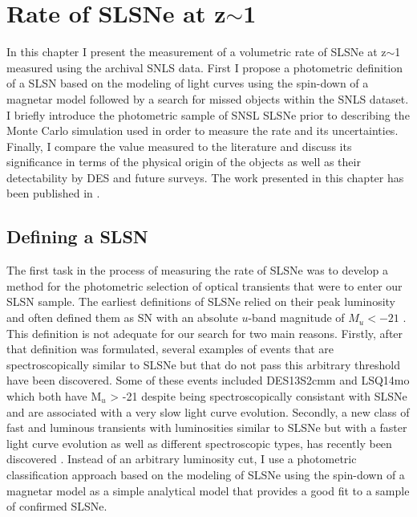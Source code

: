 \chapter{Rate of SLSNe at z$\sim$1}
\label{Chapter3}

In this chapter I present the measurement of a volumetric rate of SLSNe at z$\sim$1 measured using the archival SNLS data. First I propose a photometric definition of a SLSN based on the modeling of light curves using the spin-down of a magnetar model followed by a search for missed objects within the SNLS dataset. I briefly introduce the photometric sample of SNSL SLSNe prior to describing the Monte Carlo simulation used in order to measure the rate and its uncertainties. Finally, I compare the value measured to the literature and discuss its significance in terms of the physical origin of the objects as well as their detectability by DES and future surveys. The work presented in this chapter has been published in \citet{Prajs2016}.

\section{Defining a SLSN}
\label{sec:SLSNDefinition}
The first task in the process of measuring the rate of SLSNe was to develop a method for the photometric selection of optical transients that were to enter our SLSN sample. The earliest definitions of SLSNe relied on their peak luminosity and often defined them as SN with an absolute $u$-band magnitude of $M_{u}<-21$ \citep{Gal-Yam2012}. This definition is not adequate for our search for two main reasons. Firstly, after that definition was formulated, several examples of events that are spectroscopically similar to SLSNe but that do not pass this arbitrary threshold have been discovered. Some of these events included DES13S2cmm \citep{Papadopoulos2015} and LSQ14mo \citep{Leloudas2015a} which both have M$_u$ > -21 despite being spectroscopically consistant with SLSNe and are associated with a very slow light curve evolution. Secondly, a new class of fast and luminous transients with luminosities similar to SLSNe but with a faster light curve evolution as well as different spectroscopic types, has recently been discovered \citep{Arcavi2016}. Instead of an arbitrary luminosity cut, I use a photometric classification approach based on the modeling of SLSNe using the spin-down of a magnetar model as a simple analytical model that provides a good fit to a sample of confirmed SLSNe.

